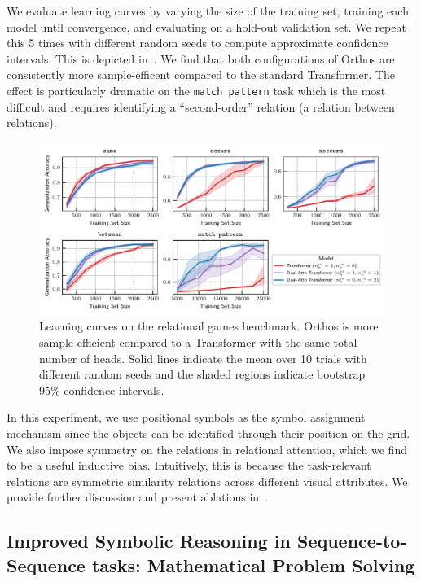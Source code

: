We evaluate learning curves by varying the size of the training set, training each model until convergence, and evaluating on a hold-out validation set. We repeat this 5 times with different random seeds to compute approximate confidence intervals. This is depicted in~. We find that both configurations of Orthos are consistently more sample-efficent compared to the standard Transformer. The effect is particularly dramatic on the \texttt{match pattern} task which is the most difficult and requires identifying a ``second-order'' relation (a relation between relations).

\begin{figure}
    \includegraphics[width=\textwidth]{figs/experiments/relgames/relgames_learning_curves.pdf}
    \caption{Learning curves on the relational games benchmark. Orthos is more sample-efficient compared to a Transformer with the same total number of heads. Solid lines indicate the mean over 10 trials with different random seeds and the shaded regions indicate bootstrap 95\% confidence intervals.}\label{fig:relgames_learning_curves}
\end{figure}

In this experiment, we use positional symbols as the symbol assignment mechanism since the objects can be identified through their position on the grid. We also impose symmetry on the relations in relational attention, which we find to be a useful inductive bias. Intuitively, this is because the task-relevant relations are symmetric similarity relations across different visual attributes. We provide further discussion and present ablations in~.

\subsection{Improved Symbolic Reasoning in Sequence-to-Sequence tasks: Mathematical Problem Solving}\label{ssec:math}

